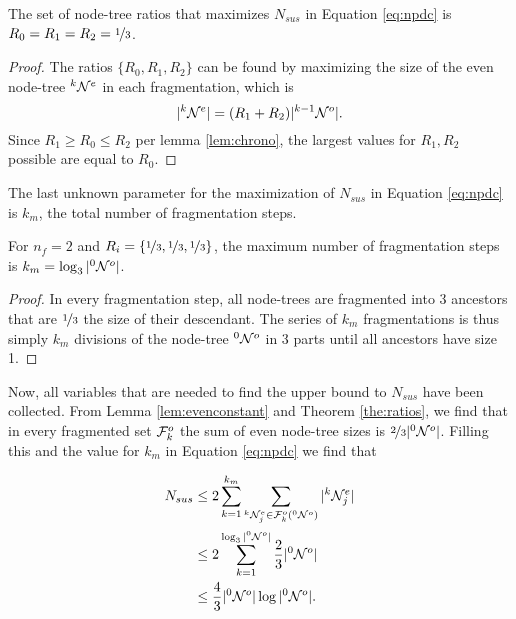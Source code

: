\begin{theorem}\label{the:ratios}
  The set of node-tree ratios that maximizes $N_{sus}$ in Equation \eqref{eq:npdc} is $R_0 = R_1 = R_2 = \nicefrac{1}{3}$.
\end{theorem}
\begin{proof}
  The ratios $\{R_0, R_1, R_2\}$ can be found by maximizing the size of the even node-tree ${}^{k}\mathcal{N}^e$ in each fragmentation, which is 
  \begin{equation*}
    \lvert{}^{k}\mathcal{N}^e\rvert = (R_1 + R_2)\lvert{}^{k-1}\mathcal{N}^o\rvert.
  \end{equation*}
  Since $ R_1 \geq R_0 \leq R_2$ per lemma \ref{lem:chrono}, the largest values for $R_1, R_2$ possible are equal to $R_0$.
\end{proof}

The last unknown parameter for the maximization of $N_{sus}$ in Equation \eqref{eq:npdc} is $k_m$, the total number of fragmentation steps.

\begin{theorem}\label{the:km}
  For $n_f = 2$ and $R_i = \{\nicefrac{1}{3},\nicefrac{1}{3},\nicefrac{1}{3}\}$, the maximum number of fragmentation steps is $k_m = \log_3{\lvert{}^{0}\mathcal{N}^o\rvert}$.
\end{theorem}
\begin{proof}
  In every fragmentation step, all node-trees are fragmented into 3 ancestors that are $\nicefrac{1}{3}$ the size of their descendant. The series of $k_m$ fragmentations is thus simply $k_m$ divisions of the node-tree ${}^{0}\mathcal{N}^o$ in 3 parts until all ancestors have size 1.
\end{proof}

Now, all variables that are needed to find the upper bound to $N_{sus}$ have been collected. From Lemma \ref{lem:evenconstant} and Theorem \ref{the:ratios}, we find that in every fragmented set $\mathcal{F}^o_k$ the sum of even node-tree sizes is $\nicefrac{2}{3}\lvert{}^{0}\mathcal{N}^o\rvert$. Filling this and the value for $k_m$ in Equation \eqref{eq:npdc} we find that

\begin{align}
  \nonumber N_{sus} &\leq 2\sum_{k=1}^{k_{m}}{ \sum_{ {}^{k}\mathcal{N}_j^e \in \mathcal{F}^o_k({}^{0}\mathcal{N}^o) }{ \lvert{}^{k}\mathcal{N}_j^e\rvert } } \\
  \nonumber         &\leq 2\sum_{k=1}^{\log_3{\lvert{}^{0}\mathcal{N}^o\rvert}} \frac{2}{3}\lvert{}^{0}\mathcal{N}^o\rvert\\
                    &\leq \frac{4}{3}\lvert{}^{0}\mathcal{N}^o\rvert\log{\lvert {}^{0} \mathcal{N}^o\rvert}.
\end{align}

